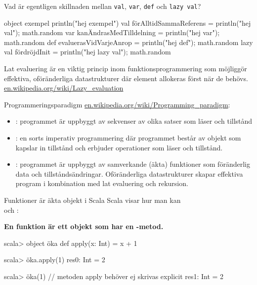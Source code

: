 \begin{Slide}{Vad är egentligen skillnaden mellan \texttt{val}, \texttt{var}, \texttt{def} och \texttt{lazy val}?}
\begin{Code}[basicstyle=\ttfamily\fontsize{8}{11}\selectfont]
object exempel {
  println("hej exempel")
  val förAlltidSammaReferens  = { println("hej val"); math.random }
  var kanÄndrasMedTilldelning = { println("hej var"); math.random }
  def evaluerasVidVarjeAnrop  = { println("hej def"); math.random }
  lazy val fördröjdInit  = { println("hej lazy val"); math.random }
}
\end{Code}
\vspace{1em}\pause
Lat evaluering är en viktig princip inom funktionsprogrammering som möjliggör effektiva, oföränderliga datastrukturer där element allokeras först när de behövs. \\
\href{https://en.wikipedia.org/wiki/Lazy_evaluation}{en.wikipedia.org/wiki/Lazy\_evaluation}
\end{Slide}





\begin{Slide}{Programmeringsparadigm}
\href{https://en.wikipedia.org/wiki/Programming_paradigm}{en.wikipedia.org/wiki/Programming\_paradigm}:
\begin{itemize}
\item {}: programmet är uppbyggt av sekvenser av olika satser som läser och  tillstånd
\item {}: en sorts imperativ programmering där programmet består av objekt som kapslar in tillstånd och erbjuder operationer som läser och  tillstånd.
\item {}: programmet är uppbyggt av samverkande (äkta) funktioner som  föränderlig data och tillståndsändringar. Oföränderliga datastrukturer skapar effektiva program i kombination med lat evaluering och rekursion.
\end{itemize}
\end{Slide}


\begin{Slide}{Funktioner är äkta objekt i Scala}
Scala visar hur man kan   \\  och : \\\vspace{0.5em}

\textbf{En funktion är ett objekt som har en -metod.}
\pause
\begin{REPLnonum}
scala> object öka {
         def apply(x: Int) = x + 1
       }

scala> öka.apply(1)
res0: Int = 2

scala> öka(1)   // metoden apply behöver ej skrivas explicit
res1: Int = 2
\end{REPLnonum}
\end{Slide}



